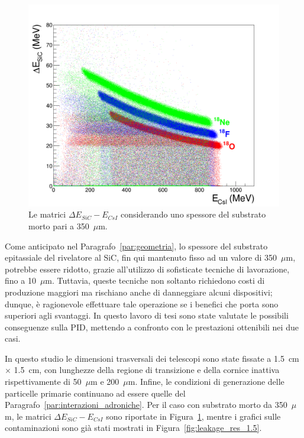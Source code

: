\subsection{}

\begin{figure} [!t]
	\centering
	\includegraphics[width=\textwidth, keepaspectratio]{Grafici_Tesi/1.5per1.5/deltaE_ERes.png}
	\caption{Le matrici $\Delta E_{SiC} - E_{CsI}$ considerando uno spessore del substrato morto pari a 350~$\mu$m.} \label{fig:deltaE_ERes_1.5}
\end{figure}


Come anticipato nel Paragrafo~\ref{par:geometria}, lo spessore del substrato epitassiale del rivelatore al SiC, fin qui mantenuto fisso ad un valore di 350~$\mu$m, potrebbe essere ridotto, grazie all'utilizzo di sofisticate tecniche di lavorazione, fino a 10~$\mu$m.
Tuttavia, queste tecniche non soltanto richiedono costi di produzione maggiori ma rischiano anche di danneggiare alcuni dispositivi;
dunque, è ragionevole effettuare tale operazione se i benefici che porta sono superiori agli svantaggi.
In questo lavoro di tesi sono state valutate le possibili conseguenze sulla PID, mettendo a confronto con le prestazioni ottenibili nei due casi.

In questo studio le dimensioni trasversali dei telescopi sono state fissate a 1.5~cm $\times$ 1.5~cm, con lunghezze della regione di transizione e della cornice inattiva rispettivamente di 50~$\mu$m e 200~$\mu$m.
Infine, le condizioni di generazione delle particelle primarie continuano ad essere quelle del Paragrafo~\ref{par:interazioni_adroniche}.
Per il caso con substrato morto da 350~$\mu$m, le matrici $\Delta E_{SiC} - E_{CsI}$ sono riportate in Figura~\ref{fig:deltaE_ERes_1.5}, mentre i grafici sulle contaminazioni sono già stati mostrati in Figura~\ref{fig:leakage_res_1.5}.


